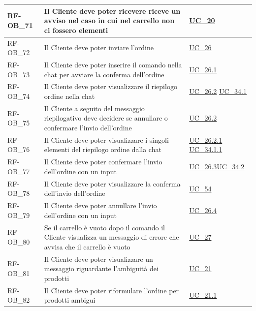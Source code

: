 \begin{longtable}{|>{\raggedright}p{}|>{\raggedright\arraybackslash}p{}|>{\raggedright\arraybackslash}p{}|}
	\hline
	RF-OB\_71 \hypertarget{rf-ob_71} & Il Cliente deve poter ricevere riceve un avviso nel caso in cui nel carrello non ci fossero elementi & \hyperref[uc_20]{UC\_20} \\
	\hline
	RF-OB\_72 \hypertarget{rf-ob_72} & Il Cliente deve poter inviare l'ordine & \hyperref[uc_26]{UC\_26} \\
	\hline
	RF-OB\_73 \hypertarget{rf-ob_73} & Il Cliente deve poter inserire il comando \vr{/invia} nella chat per avviare la conferma dell'ordine & \hyperref[uc_26.1]{UC\_26.1} \\
	\hline
	RF-OB\_74 \hypertarget{rf-ob_74} & Il Cliente deve poter visualizzare il riepilogo ordine nella chat & \hyperref[uc_26.2]{UC\_26.2} \newline \hyperref[uc_34.1]{UC\_34.1}\\
	\hline
	RF-OB\_75 \hypertarget{rf-ob_75} & Il Cliente a seguito del messaggio riepilogativo deve decidere se annullare o confermare l'invio dell'ordine & \hyperref[uc_26.2]{UC\_26.2} \\
	\hline
	RF-OB\_76 \hypertarget{rf-ob_76} & Il Cliente deve poter visualizzare i singoli elementi del riepilogo ordine dalla chat & \hyperref[uc_26.2.1]{UC\_26.2.1} \newline \hyperref[uc_34.1.1]{UC\_34.1.1} \\
	\hline
	RF-OB\_77 \hypertarget{rf-ob_77} & Il Cliente deve poter confermare l'invio dell'ordine con un input & \hyperref[uc_26.3]{UC\_26.3}\newline \hyperref[uc_34.2]{UC\_34.2} \\
	\hline
	RF-OB\_78 \hypertarget{rf-ob_78} & Il Cliente deve poter visualizzare la conferma dell'invio dell'ordine & \hyperref[uc_54]{UC\_54}\\
	\hline
	RF-OB\_79 \hypertarget{rf-ob_79} & Il Cliente deve poter annullare l'invio dell'ordine con un input & \hyperref[uc_26.4]{UC\_26.4}\\
	\hline
	RF-OB\_80 \hypertarget{rf-ob_80} & Se il carrello è vuoto dopo il comando \vr{/invia} il Cliente visualizza un messaggio di errore che avvisa che il carrello è vuoto & \hyperref[uc_27]{UC\_27} \\
	\hline
	RF-OB\_81 \hypertarget{rf-ob_81} & Il Cliente deve poter visualizzare un messaggio riguardante l'ambiguità dei prodotti & \hyperref[uc_21]{UC\_21} \\
	\hline
	RF-OB\_82 \hypertarget{rf-ob_82} & Il Cliente deve poter riformulare l'ordine per prodotti ambigui & \hyperref[uc_21.1]{UC\_21.1} \\

\end{longtable}
